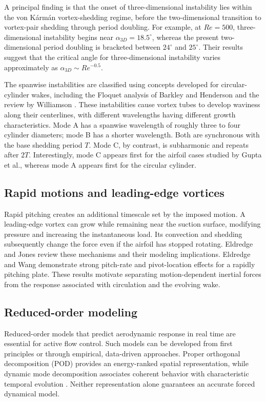 
A principal finding is that the onset of three-dimensional instability lies within the von K\'arm\'an vortex-shedding regime, before the two-dimensional transition to vortex-pair shedding through period doubling. For example, at $Re=500$, three-dimensional instability begins near $\alpha_{3D}=18.5^\circ$, whereas the present two-dimensional period doubling is bracketed between $24^\circ$ and $25^\circ$. Their results suggest that the critical angle for three-dimensional instability varies approximately as $\alpha_{3D}\sim Re^{-0.5}$.

The spanwise instabilities are classified using concepts developed for circular-cylinder wakes, including the Floquet analysis of Barkley and Henderson \cite{barkley} and the review by Williamson \cite{williamson}. These instabilities cause vortex tubes to develop waviness along their centerlines, with different wavelengths having different growth characteristics. Mode A has a spanwise wavelength of roughly three to four cylinder diameters; mode B has a shorter wavelength. Both are synchronous with the base shedding period $T$. Mode C, by contrast, is subharmonic and repeats after $2T$. Interestingly, mode C appears first for the airfoil cases studied by Gupta et al., whereas mode A appears first for the circular cylinder.

\subsection{Rapid motions and leading-edge vortices}
Rapid pitching creates an additional timescale set by the imposed motion. A leading-edge vortex can grow while remaining near the suction surface, modifying pressure and increasing the instantaneous load. Its convection and shedding subsequently change the force even if the airfoil has stopped rotating. Eldredge and Jones \cite{eldredge2019} review these mechanisms and their modeling implications. Eldredge and Wang \cite{eldredge2010} demonstrate strong pitch-rate and pivot-location effects for a rapidly pitching plate. These results motivate separating motion-dependent inertial forces from the response associated with circulation and the evolving wake.

\subsection{Reduced-order modeling}
Reduced-order models that predict aerodynamic response in real time are essential for active flow control. Such models can be developed from first principles or through empirical, data-driven approaches. Proper orthogonal decomposition (POD) provides an energy-ranked spatial representation, while dynamic mode decomposition associates coherent behavior with characteristic temporal evolution \cite{bruntonbook,mlfluids}. Neither representation alone guarantees an accurate forced dynamical model.

